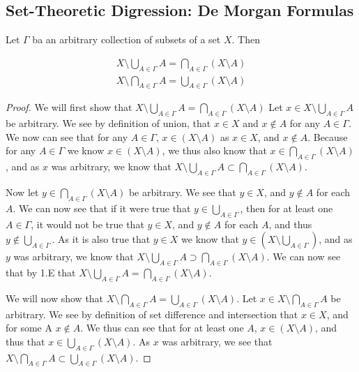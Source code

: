 \subsection{Set-Theoretic Digression: De Morgan Formulas}
\begin{majorEx}
  Let $\Gamma$ ba an arbitrary collection of subsets of a set
  $X$. Then
  
\begin{align}
  X \setminus \bigcup_{A \in \Gamma} A = \bigcap_{A\in\Gamma} (X
  \setminus A) \\
  X \setminus \bigcap_{A \in \Gamma} A = \bigcup_{A\in\Gamma} (X
  \setminus A) 
\end{align}
\end{majorEx}

\begin{proof}
  We will first show that 
  $X \setminus \bigcup_{A \in \Gamma} A = \bigcap_{A\in\Gamma} (X
  \setminus A)$
  Let $x \in X \setminus \bigcup_{A \in\Gamma} A$ be arbitrary. We see
  by definition of union, that $x\in X$ and $x \notin A$ for any $A
  \in \Gamma$. We now can see that for any $A\in \Gamma$, $x \in (X \setminus A)$
  as $x\in X$, and  $x \notin A$. Because for any $A\in \Gamma$
  we know $x \in ( X \setminus A)$, we thus also know that 
  $x\in \bigcap_{A\in\Gamma} (X \setminus A)$, and as $x$ was
  arbitrary, we know that 
  $X \setminus \bigcup_{A \in \Gamma} A \subset \bigcap_{A\in\Gamma} (X
  \setminus A)$.

  Now let $y \in \bigcap_{A\in\Gamma} (X \setminus A)$ be
  arbitrary. We see that $y \in X$, and $y\notin A$ for each $A$. We
  can now see that if it were true that $y\in \bigcup_{A\in\Gamma}$,
  then for at least one $A\in \Gamma$, it would not be true that 
  $y \in X$, and $y\notin A$ for each $A$, and thus  
  $y\notin \bigcup_{A\in\Gamma}$. As it is also true that $y\in X$ we know
  that $y \in (X \setminus \bigcup_{A\in \Gamma})$, and as $y$ was
  arbitrary, we know that   
  $X \setminus \bigcup_{A \in \Gamma} A \supset \bigcap_{A\in\Gamma} 
  (X \setminus A)$. We can now see that by 1.E that 
  $X \setminus \bigcup_{A \in \Gamma} A  = \bigcap_{A\in\Gamma} (X
  \setminus A)$.

We will now show that 
$X \setminus \bigcap_{A \in \Gamma} A = \bigcup_{A\in\Gamma} (X
\setminus A)$.
Let $x \in X \setminus \bigcap_{A \in \Gamma} A$ be arbitrary. We see
by definition of set difference and intersection that $x \in X$, and
for some A $x\notin A$. We thus can see that for at least one $A$, $x\in
(X \setminus A)$, and thus that 
$x\in \bigcup_{A\in\Gamma} (X\setminus A)$. As $x$ was arbitrary, we
see that $X \setminus \bigcap_{A \in \Gamma} A \subset \bigcup_{A\in\Gamma} (X
\setminus A)$.


\end{proof}
